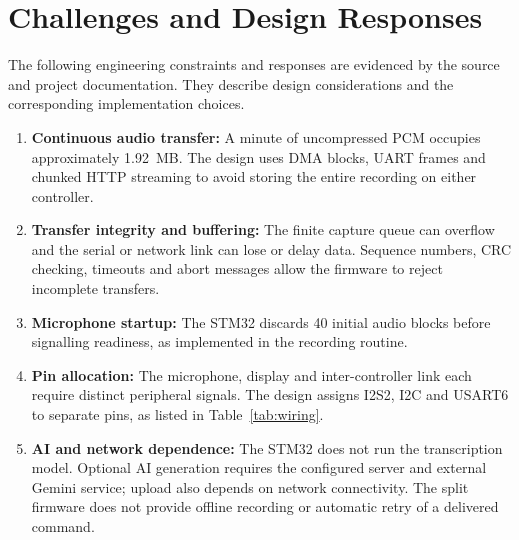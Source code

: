 \documentclass[a4paper,12pt,oneside]{report}
\begin{document}
\section{Challenges and Design Responses}
The following engineering constraints and responses are evidenced by the source and project documentation. They describe design considerations and the corresponding implementation choices.
\begin{enumerate}
\item \textbf{Continuous audio transfer:} A minute of uncompressed PCM occupies approximately 1.92~MB. The design uses DMA blocks, UART frames and chunked HTTP streaming to avoid storing the entire recording on either controller.
\item \textbf{Transfer integrity and buffering:} The finite capture queue can overflow and the serial or network link can lose or delay data. Sequence numbers, CRC checking, timeouts and abort messages allow the firmware to reject incomplete transfers.
\item \textbf{Microphone startup:} The STM32 discards 40 initial audio blocks before signalling readiness, as implemented in the recording routine.
\item \textbf{Pin allocation:} The microphone, display and inter-controller link each require distinct peripheral signals. The design assigns I2S2, I2C and USART6 to separate pins, as listed in Table~\ref{tab:wiring}.
\item \textbf{AI and network dependence:} The STM32 does not run the transcription model. Optional AI generation requires the configured server and external Gemini service; upload also depends on network connectivity. The split firmware does not provide offline recording or automatic retry of a delivered command.
\end{enumerate}
\end{document}
